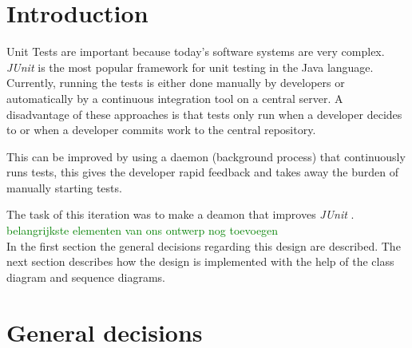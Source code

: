 \documentclass[i2]{oss}
\newcommand{\junit}{\emph{JUnit }}
\newcommand{\comment}[1]{{\huge \textcolor{green}{#1}}\\}
\begin{document}

\maketitlepage
\newpage
\tableofcontents
\pagebreak




\section*{Introduction}
\label{ssec:introduction}

Unit Tests are important because today's software systems are very 
complex.
\junit is the most popular framework for unit testing in the Java 
language.
Currently, running the tests is either done manually by developers or
automatically by a continuous integration tool on a central server.
A disadvantage of these approaches is that tests only run when a 
developer decides to or when a developer commits work to the central 
repository.

This can be improved by using a daemon (background process) that continuously runs tests, this gives the developer rapid feedback and 
takes away the burden of manually starting tests.

The task of this iteration was to make a deamon that improves \junit.
\comment{belangrijkste elementen van ons ontwerp nog toevoegen}

In the first section the general decisions regarding this design are described. The next section describes how the design is implemented with the help of the class diagram and sequence diagrams.

\section{General decisions}
\label{ssec:general-decisions}
\end{document}
